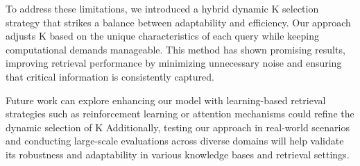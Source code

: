 \documentclass[review]{jair}
\begin{document}
To address these limitations, we introduced a hybrid dynamic K selection strategy that strikes a balance between adaptability and efficiency. Our approach adjusts K based on the unique characteristics of each query while keeping computational demands manageable. This method has shown promising results, improving retrieval performance by minimizing unnecessary noise and ensuring that critical information is consistently captured.

Future work can explore enhancing our model with learning-based retrieval strategies such as reinforcement learning or attention mechanisms could refine the dynamic selection of K Additionally, testing our approach in real-world scenarios and conducting large-scale evaluations across diverse domains will help validate its robustness and adaptability in various knowledge bases and retrieval settings.
\end{document}
